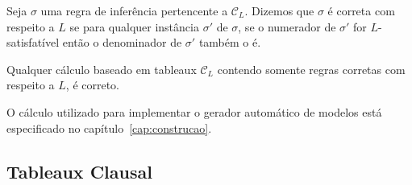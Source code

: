 \begin{definition}
    Seja $\sigma$ uma regra de inferência pertencente a $\mathcal{C}_L$. Dizemos
    que $\sigma$ é correta com respeito a $L$ se para qualquer instância $\sigma
    '$ de $\sigma$, se o numerador de $\sigma '$ for $L$-satisfatível então o
    denominador de $\sigma '$ também o é.
\end{definition}

Qualquer cálculo baseado em tableaux $\mathcal{C}_L$ contendo somente regras corretas com respeito a $L$, é
correto. 

O cálculo utilizado para implementar o gerador automático de modelos está
especificado no capítulo~\ref{cap:construcao}.

\subsection{Tableaux Clausal}
